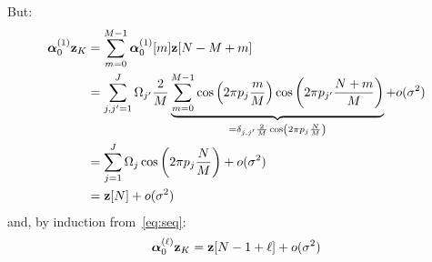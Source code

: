 But:
\begin{align*}
\boldsymbol{\alpha}_0^{(1)}{\mathbf z}_{K} &=\sum_{m=0}^{M-1}\boldsymbol{\alpha}_0^{(1)}[m]{\mathbf z}[N-M+m] \\
&=\sum_{j,j'=1}^J\Omega_{j'}\dfrac{2}{M}\underbrace{\sum_{m=0}^{M-1}\cos\left(2\pi p_j\frac{m}{M}\right)\cos\left(2\pi p_{j'}\dfrac{N+m}{M}\right)}_{=\delta_{j,j'}\frac2M\cos\left(2\pi p_j\frac{N}M\right)} + o(\sigma^2) \\
&= \sum_{j=1}^J\Omega_j\cos\left(2\pi p_j\dfrac{N}{M}\right) + o(\sigma^2) \\
&= {\mathbf z}[N] + o(\sigma^2)
\end{align*}
and, by induction from~\eqref{eq:seq}:
\begin{equation}
\label{eq:alpha0z.sine}
\boldsymbol{\alpha}_0^{(\ell)}{\mathbf z}_{K} = {\mathbf z}[N-1+\ell] + o(\sigma^2)
\end{equation}


